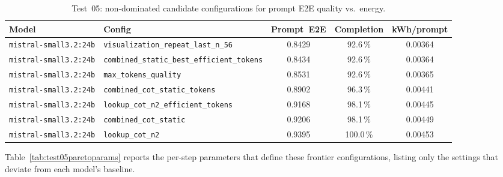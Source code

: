 \begin{table}[H]
\centering
{}
\small
\begin{tabular}{|Y{2.7cm}|Y{5cm}|c|c|c|}
\hline
{}
\textbf{Model} & \textbf{Config} & \textbf{Prompt~E2E} & \textbf{Completion} & \textbf{kWh/prompt} \T\B \\
\hline
\texttt{mistral-\allowbreak small3.2:24b} & \texttt{visualization\_repeat\_last\_n\_56} & 0.8429 & 92.6\,\% & 0.00364 \T\B \\
\hline
\texttt{mistral-\allowbreak small3.2:24b} & \texttt{combined\_static\_best\_efficient\_tokens} & 0.8434 & 92.6\,\% & 0.00364 \T\B \\
\hline
\texttt{mistral-\allowbreak small3.2:24b} & \texttt{max\_tokens\_quality} & 0.8531 & 92.6\,\% & 0.00365 \T\B \\
\hline
\texttt{mistral-\allowbreak small3.2:24b} & \texttt{combined\_cot\_static\_tokens} & 0.8902 & 96.3\,\% & 0.00441 \T\B \\
\hline
\texttt{mistral-\allowbreak small3.2:24b} & \texttt{lookup\_cot\_n2\_\allowbreak efficient\_tokens} & 0.9168 & 98.1\,\% & 0.00445 \T\B \\
\hline
\texttt{mistral-\allowbreak small3.2:24b} & \texttt{combined\_cot\_static} & 0.9206 & 98.1\,\% & 0.00449 \T\B \\
\hline
\texttt{mistral-\allowbreak small3.2:24b} & \texttt{lookup\_cot\_n2} & 0.9395 & 100.0\,\% & 0.00453 \T\B \\
\hline
\end{tabular}
\caption{Test~05: non-dominated candidate configurations for prompt E2E quality vs.\ energy.}
\label{tab:test05pareto}
\end{table}

Table~\ref{tab:test05paretoparams} reports the per-step parameters that define
these frontier configurations, listing only the settings that deviate from
each model's baseline.

